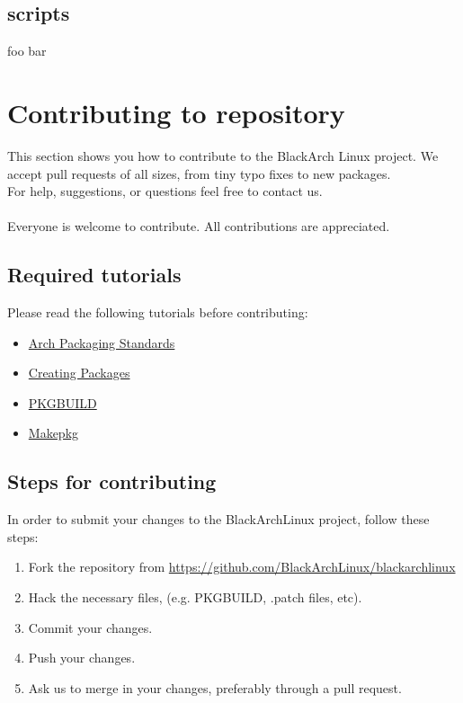 \documentclass[a4paper, oneside, 11pt]{book}
\begin{document}
\subsection{scripts}
foo bar

\section{Contributing to repository}
This section shows you how to contribute to the BlackArch Linux project. We
accept pull requests of all sizes, from tiny typo fixes to new packages.\\For
help, suggestions, or questions feel free to contact us.
\\\\
Everyone is welcome to contribute. All contributions are appreciated.

\subsection{Required tutorials}
Please read the following tutorials before contributing:
\begin{itemize}
\item
\href{https://wiki.archlinux.org/index.php/Arch\_Packaging\_Standards)}{Arch
Packaging Standards}
\item \href{https://wiki.archlinux.org/index.php/Creating\_Packages}{Creating
Packages}
\item \href{https://wiki.archlinux.org/index.php/PKGBUILD}{PKGBUILD}
\item \href{https://wiki.archlinux.org/index.php/Makepkg}{Makepkg}
\end{itemize}

\subsection{Steps for contributing}
In order to submit your changes to the BlackArchLinux project, follow these
steps:
\begin{enumerate}
\item Fork the repository from
\url{https://github.com/BlackArchLinux/blackarchlinux}
\item Hack the necessary files, (e.g. PKGBUILD, .patch files, etc).
\item Commit your changes.
\item Push your changes.
\item Ask us to merge in your changes, preferably through a pull request.
\end{enumerate}
\end{document}
